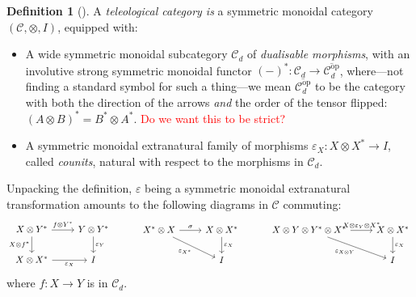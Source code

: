 \documentclass[11pt,a4paper]{article}
\theoremstyle{plain}
\theoremstyle{definition}
\newtheorem{definition}[theorem]{Definition}
\newcommand{\C}{\mathscr{C}}
\newcommand{\op}{\mathrm{op}}
\newcommand{\todo}[1]{\textcolor{red}{\small #1}}
\begin{document}
\begin{definition}[{\cite[Definition 5.1]{CoherenceForLenses}}]
A \emph{teleological category is} a symmetric monoidal category $(\C, \otimes, I)$, equipped with:
\begin{itemize}
\item A wide symmetric monoidal subcategory $\C_d$ of \emph{dualisable morphisms}, with an involutive strong symmetric monoidal functor $(-)^* : \C_d \to \overline{\C_d^\op}$, where---not finding a standard symbol for such a thing---we mean $\overline{\C_d^\op}$ to be the category with both the direction of the arrows \emph{and} the order of the tensor flipped: $(A \otimes B)^* = B^* \otimes A^*$. \todo{Do we want this to be strict?}
\item A symmetric monoidal extranatural family of morphisms $\varepsilon_X : X \otimes X^* \to I$, called \emph{counits}, natural with respect to the morphisms in $\C_d$.
\end{itemize}
\end{definition}
Unpacking the definition, $\varepsilon$ being a symmetric monoidal extranatural transformation amounts to the following diagrams in $\C$ commuting:
\[
\begin{tikzcd}
X \otimes Y^* \ar[r, "f \otimes Y^*"]  \ar[d, "X \otimes f^*", swap] & Y \otimes Y^* \ar[d, "\varepsilon_Y"] \\
X \otimes X^* \ar[r, "\varepsilon_X", swap] & I
\end{tikzcd} \hspace{1cm}
\begin{tikzcd}
X^* \otimes X \ar[r, "\sigma"]  \ar[dr, "\varepsilon_{X^*}", swap] & X \otimes X^* \ar[d, "\varepsilon_X"] \\
& I
\end{tikzcd} \hspace{1cm}
\begin{tikzcd}
X \otimes Y \otimes Y^* \otimes X^* \ar[r, "X \otimes \varepsilon_Y \otimes X^*"]  \ar[dr, "\varepsilon_{X \otimes Y}", swap] & X \otimes X^* \ar[d, "\varepsilon_X"] \\
& I
\end{tikzcd}
\] 
where $f : X \to Y$ is in $\C_d$.
\end{document}
